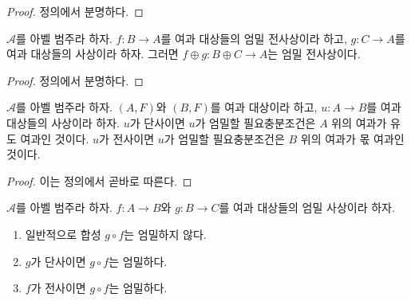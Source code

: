 \begin{proof}
정의에서 분명하다.
\end{proof}

\begin{lemma}
\label{lemma-add-summand-strict-epimorphism}
$\mathcal{A}$를 아벨 범주라 하자. $f : B \to A$를 여과 대상들의
엄밀 전사상이라 하고, $g : C \to A$를 여과 대상들의 사상이라 하자.
그러면 $f \oplus g : B \oplus C \to A$는 엄밀 전사상이다.
\end{lemma}

\begin{proof}
정의에서 분명하다.
\end{proof}

\begin{lemma}
\label{lemma-induced-and-quotient-strict}
$\mathcal{A}$를 아벨 범주라 하자. $(A, F)$와 $(B, F)$를 여과 대상이라
하고, $u : A \to B$를 여과 대상들의 사상이라 하자. $u$가 단사이면
$u$가 엄밀할 필요충분조건은 $A$ 위의 여과가 유도 여과인 것이다.
$u$가 전사이면 $u$가 엄밀할 필요충분조건은 $B$ 위의 여과가
몫 여과인 것이다.
\end{lemma}

\begin{proof}
이는 정의에서 곧바로 따른다.
\end{proof}

\begin{lemma}
\label{lemma-composition-strict}
$\mathcal{A}$를 아벨 범주라 하자. $f : A \to B$와 $g : B \to C$를
여과 대상들의 엄밀 사상이라 하자.
\begin{enumerate}
\item 일반적으로 합성 $g \circ f$는 엄밀하지 않다.
\item $g$가 단사이면 $g \circ f$는 엄밀하다.
\item $f$가 전사이면 $g \circ f$는 엄밀하다.
\end{enumerate}
\end{lemma}

